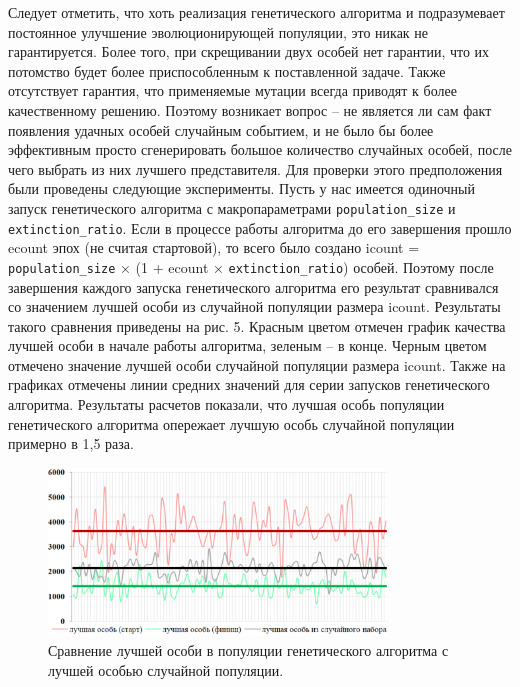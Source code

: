 Следует отметить, что хоть реализация генетического алгоритма и подразумевает постоянное улучшение эволюционирующей популяции, это никак не гарантируется.
Более того, при скрещивании двух особей нет гарантии, что их потомство будет более приспособленным к поставленной задаче.
Также отсутствует гарантия, что применяемые мутации всегда приводят к более качественному решению.
Поэтому возникает вопрос – не является ли сам факт появления удачных особей случайным событием, и не было бы более эффективным просто сгенерировать большое количество случайных особей, после чего выбрать из них лучшего представителя.
Для проверки этого предположения были проведены следующие эксперименты.
Пусть у нас имеется одиночный запуск генетического алгоритма с макропараметрами \texttt{population\_size} и \texttt{extinction\_ratio}.
Если в процессе работы алгоритма до его завершения прошло ecount эпох (не считая стартовой), то всего было создано icount = \texttt{population\_size} × (1 + ecount × \texttt{extinction\_ratio}) особей.
Поэтому после завершения каждого запуска генетического алгоритма его результат сравнивался со значением лучшей особи из случайной популяции размера icount.
Результаты такого сравнения приведены на рис. 5.
Красным цветом отмечен график качества лучшей особи в начале работы алгоритма, зеленым – в конце.
Черным цветом отмечено значение лучшей особи случайной популяции размера icount.
Также на графиках отмечены линии средних значений для серии запусков генетического алгоритма.
Результаты расчетов показали, что лучшая особь популяции генетического алгоритма опережает лучшую особь случайной популяции примерно в 1,5 раза.

\begin{figure}[ht]
	\centering
		\includegraphics[width=0.8\textwidth]{./pics/text_2_genetic/chart2.png}
	\caption{Сравнение лучшей особи в популяции генетического алгоритма с лучшей особью случайной популяции.}
	\label{fig:text_2_genetic_chart2}
\end{figure}

